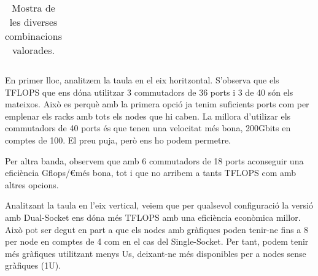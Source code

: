 \begin{table}[H]
\begin{adjustwidth}{-1.0in}{-1.0in}
\begin{center}
\begin{tabular}{ll|c|c|c|c}
\end{tabular}
\caption{Mostra de les diverses combinacions valorades.}
\end{center}
\end{adjustwidth}
\end{table}

En primer lloc, analitzem la taula en el eix horitzontal. S'observa que els TFLOPS que ens dóna utilitzar 3 commutadors de 36 ports i 3 de 40 són els mateixos. Això es perquè amb la primera opció ja tenim suficients ports com per emplenar els racks amb tots els nodes que hi caben. La millora d'utilizar els commutadors de 40 ports és que tenen una velocitat més bona, 200Gbits en comptes de 100. El preu puja, però ens ho podem permetre.

Per altra banda, observem que amb 6 commutadors de 18 ports aconseguir una eficiència Gflops/\euro més bona, tot i que no arribem a tants TFLOPS com amb altres opcions.

Analitzant la taula en l'eix vertical, veiem que per qualsevol configuració la versió amb Dual-Socket ens dóna més TFLOPS amb una eficiència econòmica millor. Això pot ser degut en part a que els nodes amb gràfiques poden tenir-ne fins a 8 per node en comptes de 4 com en el cas del Single-Socket. Per tant, podem tenir més gràfiques utilitzant menys Us, deixant-ne més disponibles per a nodes sense gràfiques (1U).


